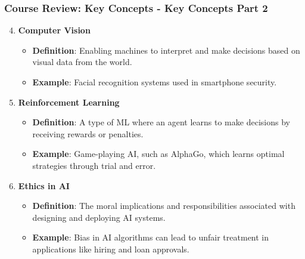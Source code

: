 \documentclass[aspectratio=169]{beamer}
\begin{document}
\begin{frame}[fragile]
    \frametitle{Course Review: Key Concepts - Key Concepts Part 2}
    \begin{enumerate}
        \setcounter{enumi}{3}
        \item \textbf{Computer Vision}
            \begin{itemize}
                \item \textbf{Definition}: Enabling machines to interpret and make decisions based on visual data from the world.
                \item \textbf{Example}: Facial recognition systems used in smartphone security.
            \end{itemize}
        
        \item \textbf{Reinforcement Learning}
            \begin{itemize}
                \item \textbf{Definition}: A type of ML where an agent learns to make decisions by receiving rewards or penalties.
                \item \textbf{Example}: Game-playing AI, such as AlphaGo, which learns optimal strategies through trial and error.
            \end{itemize}

        \item \textbf{Ethics in AI}
            \begin{itemize}
                \item \textbf{Definition}: The moral implications and responsibilities associated with designing and deploying AI systems.
                \item \textbf{Example}: Bias in AI algorithms can lead to unfair treatment in applications like hiring and loan approvals.
            \end{itemize}
    \end{enumerate}
\end{frame}
\end{document}

